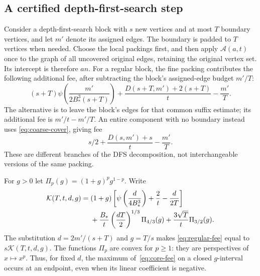 \subsection{A certified depth-first-search step}
Consider a depth-first-search block with $s$ new vertices and at most $T$
boundary vertices, and let $m'$ denote its assigned edges. The boundary is
padded to $T$ vertices when needed. Choose the local packings first, and
then apply $\mathcal A(a,t)$ once to the graph of all uncovered original
edges, retaining the original vertex set. Its intercept is therefore $an$.
For a regular block, the fine packing contributes the following additional
fee, after subtracting the block's assigned-edge budget $m'/T$:
\begin{equation}\label{eq:regular-fee}
 (s+T)\psi\left(\frac{m'}{2B_*^3(s+T)}\right)
       +\frac{D(s+T,m')+2(s+T)}t-\frac{m'}T.
\end{equation}
The alternative is to leave the block's edges for that common suffix
estimate; its additional fee is $m'/t-m'/T$. An entire component with no boundary instead uses
\eqref{eq:coarse-cover}, giving fee
\begin{equation}\label{eq:component-fee}
                  s/2+\frac{D(s,m')+s}t-\frac{m'}T.
\end{equation}
These are different branches of the DFS decomposition, not interchangeable
versions of the same packing.

For $g>0$ let $\Pi_p(g)=(1+g)^pg^{1-p}$. Write
\begin{align}
 \mathcal K(T,t,d,g)
  ={}&(1+g)\left[\psi\left(\frac{d}{4B_*^3}\right)
                              +\frac2t-\frac d{2T}\right]\notag\\
     &+\frac{B_*}{t}\left(\frac{dT}{2}\right)^{1/3}\Pi_{4/3}(g)
                +\frac{3\sqrt T}{t}\Pi_{3/2}(g).\label{eq:core-fee}
\end{align}
The substitution $d=2m'/(s+T)$ and $g=T/s$ makes
\eqref{eq:regular-fee} equal to $s\mathcal K(T,t,d,g)$.
The functions $\Pi_p$ are convex for $p\ge1$: they are perspectives of
$x\mapsto x^p$. Thus, for fixed $d$, the maximum of~\eqref{eq:core-fee}
on a closed $g$-interval occurs at an endpoint, even when its linear
coefficient is negative.

